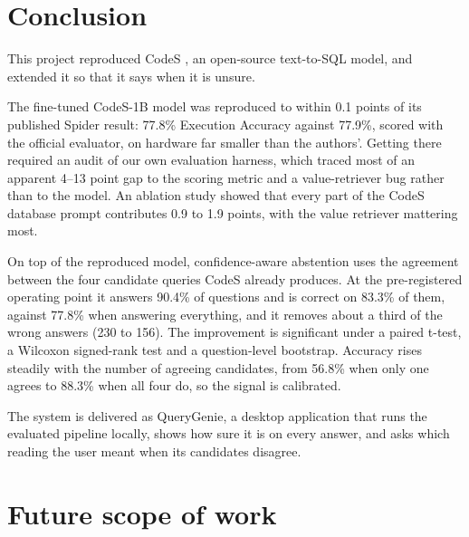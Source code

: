\section{Conclusion}

This project reproduced CodeS \cite{li2024codes}, an open-source text-to-SQL model, and extended it so that it says when it is unsure.

The fine-tuned CodeS-1B model was reproduced to within 0.1 points of its published Spider result: 77.8\% Execution Accuracy against 77.9\%, scored with the official evaluator, on hardware far smaller than the authors'. Getting there required an audit of our own evaluation harness, which traced most of an apparent 4--13 point gap to the scoring metric and a value-retriever bug rather than to the model. An ablation study showed that every part of the CodeS database prompt contributes 0.9 to 1.9 points, with the value retriever mattering most.

On top of the reproduced model, confidence-aware abstention uses the agreement between the four candidate queries CodeS already produces. At the pre-registered operating point it answers 90.4\% of questions and is correct on 83.3\% of them, against 77.8\% when answering everything, and it removes about a third of the wrong answers (230 to 156). The improvement is significant under a paired t-test, a Wilcoxon signed-rank test and a question-level bootstrap. Accuracy rises steadily with the number of agreeing candidates, from 56.8\% when only one agrees to 88.3\% when all four do, so the signal is calibrated.

The system is delivered as QueryGenie, a desktop application that runs the evaluated pipeline locally, shows how sure it is on every answer, and asks which reading the user meant when its candidates disagree.

\section{Future scope of work}

